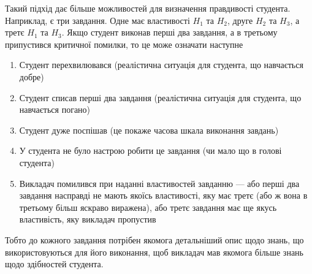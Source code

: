 Такий підхід дає більше можливостей для визначення правдивості студента.
Наприклад, є три завдання.
Одне має властивості $H_1$ та $H_2$, друге $H_2$ та $H_3$, а третє $H_1$ та
$H_3$.
Якщо студент виконав перші два завдання, а в третьому припустився критичної
помилки, то це може означати наступне
\begin{enumerate}
  \item
    Студент перехвилювався (реалістична ситуація для студента, що навчається
    добре)
  \item
    Студент списав перші два завдання (реалістична ситуація для студента, що
    навчається погано)
  \item
    Студент дуже поспішав (це покаже часова шкала виконання завдань)
  \item
    У студента не було настрою робити це завдання (чи мало що в голові студента)
  \item
    Викладач помилився при наданні властивостей завданню --- або перші два
    завдання насправді не мають якоїсь властивості, яку має третє (або ж вона
    в третьому більш яскраво виражена), або третє завдання має ще якусь
    властивість, яку викладач пропустив
\end{enumerate}

Тобто до кожного завдання потрібен якомога детальніший опис щодо знань, що
використовуються для його виконання, щоб викладач мав якомога більше знань щодо
здібностей студента.
